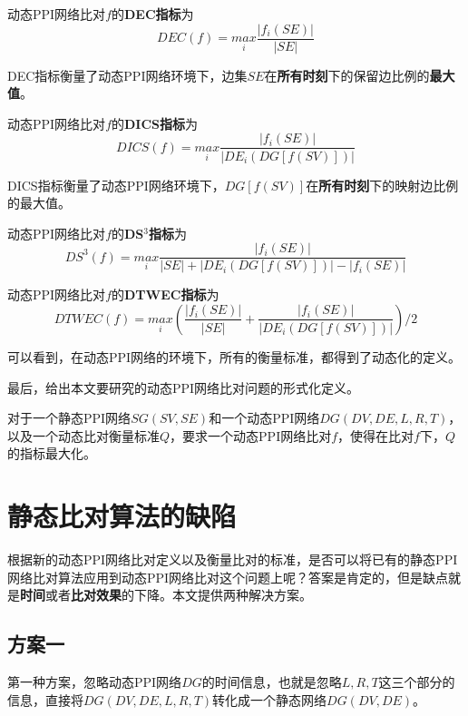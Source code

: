 \begin{defn}
\label{defndec}
动态PPI网络比对$f$的\textbf{DEC指标}为
$$DEC(f)=\underset{i}{max}\frac{\left | f_i(SE) \right |}{\left | SE \right |}$$
\end{defn}

DEC指标衡量了动态PPI网络环境下，边集$SE$在\textbf{所有时刻}下的保留边比例的\textbf{最大值}。

\begin{defn}
\label{defndics}
动态PPI网络比对$f$的\textbf{DICS指标}为$$DICS(f)=\underset{i}{max}\frac{\left | f_i(SE) \right |}{\left |DE_i(DG[f(SV)])\right |}$$
\end{defn}

DICS指标衡量了动态PPI网络环境下，$DG[f(SV)]$在\textbf{所有时刻}下的映射边比例的最大值。

\begin{defn}
\label{defnds3}
动态PPI网络比对$f$的\textbf{DS}$^3$\textbf{指标}为
$$DS^{3}(f)=\underset{i}{max}\frac{\left | f_i(SE) \right |}{\left | SE \right |+\left |DE_i(DG[f(SV)]) \right |-\left | f_i(SE) \right |}$$
\end{defn}


\begin{defn}
\label{defndtwec}
动态PPI网络比对$f$的\textbf{DTWEC指标}为$$DTWEC(f)=\underset{i}{max}(\frac{\left | f_i(SE) \right |}{\left | SE \right |}+\frac{\left | f_i(SE) \right |}{\left |DE_i(DG[f(SV)])\right |})/2$$
\end{defn}

可以看到，在动态PPI网络的环境下，所有的衡量标准，都得到了动态化的定义。

最后，给出本文要研究的动态PPI网络比对问题的形式化定义。

\begin{prob}[动态PPI网络比对问题]
\label{probdgna}
对于一个静态PPI网络$SG(SV,SE)$和一个动态PPI网络$DG(DV,DE,L,R,T)$，以及一个动态比对衡量标准$Q$，要求一个动态PPI网络比对$f$，使得在比对$f$下，$Q$的指标最大化。
\end{prob}
\section{静态比对算法的缺陷}
根据新的动态PPI网络比对定义以及衡量比对的标准，是否可以将已有的静态PPI网络比对算法应用到动态PPI网络比对这个问题上呢？答案是肯定的，但是缺点就是\textbf{时间}或者\textbf{比对效果}的下降。本文提供两种解决方案。

\subsection{方案一}
第一种方案，忽略动态PPI网络$DG$的时间信息，也就是忽略$L,R,T$这三个部分的信息，直接将$DG(DV,DE,L,R,T)$转化成一个静态网络$DG(DV,DE)$。

